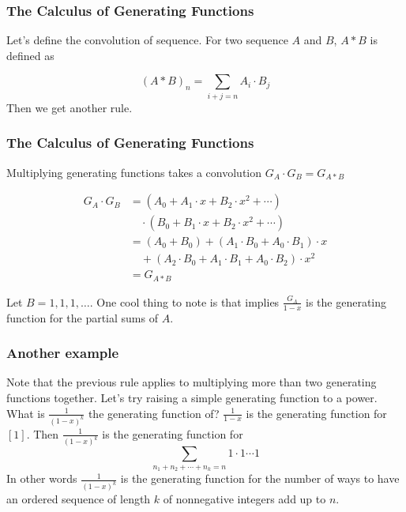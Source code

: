 \documentclass{beamer}
\begin{document}
\begin{frame}
    \frametitle{The Calculus of Generating Functions}

    Let's define the convolution of sequence. For two sequence $A$ and $B$, $A \ast B$ is defined as

    $$(A \ast B)_n = \sum_{i + j = n} A_i \cdot B_j$$ Then we get another rule.

\end{frame}

\begin{frame}
    \frametitle{The Calculus of Generating Functions}

    \begin{block}{Multiplying generating functions takes a convolution}
        $G_A \cdot G_B = G_{A \ast B}$
    \end{block}

    \begin{align*}
        G_A \cdot G_B &= (A_0 + A_1 \cdot x + B_2 \cdot x^2 + \cdots) \\
        & \quad \cdot (B_0 + B_1 \cdot x + B_2 \cdot x^2 + \cdots) \\
        &= (A_0 + B_0) + (A_1 \cdot B_0 + A_0 \cdot B_1) \cdot x \\
        & \quad + (A_2 \cdot B_0 + A_1 \cdot B_1 + A_0 \cdot B_2) \cdot x^2 \\
        &= G_{A \ast B}
    \end{align*} \pause

    Let $B = 1, 1, 1, \ldots$. One cool thing to note is that implies $\frac{G_A}{1 - x}$ is the generating function for the partial sums of $A$.

\end{frame}

\begin{frame}
    \frametitle{Another example}

    Note that the previous rule applies to multiplying more than two generating functions together. 
    \pause
    \quad
    \newline
    \newline
    Let's try raising a simple generating function to a power. What is $\frac{1}{(1-x)^k}$ the generating function of?
    \pause
    \quad
    \newline
    \newline
    $\frac{1}{1 - x}$ is the generating function for $[1]$.
    \pause
    \quad
    \newline
    \newline
    Then $\frac{1}{(1-x)^k}$ is the generating function for $$\sum_{n_1 + n_2 + \cdots + n_k = n} 1 \cdot 1 \cdots 1$$
    \pause
    In other words $\frac{1}{(1-x)^k}$ is the generating function for the number of ways to have an ordered sequence of length $k$ of nonnegative integers add up to $n$.

\end{frame}
\end{document}
